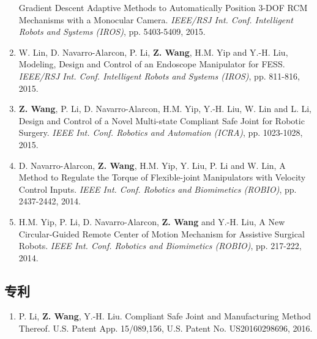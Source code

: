 \documentclass[10pt,letterpaper]{article}
\begin{document}
\begin{enumerate}
    Gradient Descent Adaptive Methods to Automatically Position 3-DOF RCM Mechanisms with a Monocular Camera.
    \textit{{IEEE/RSJ} Int. Conf. Intelligent Robots and Systems (IROS)}, pp. 5403-5409, 2015.
    \item W. Lin, D. Navarro-Alarcon, P. Li, \textbf{Z. Wang}, H.M. Yip and Y.-H. Liu,
    Modeling, Design and Control of an Endoscope Manipulator for FESS.
    \textit{{IEEE/RSJ} Int. Conf. Intelligent Robots and Systems (IROS)}, pp. 811-816, 2015.
    \item \textbf{Z. Wang}, P. Li, D. Navarro-Alarcon, H.M. Yip, Y.-H. Liu, W. Lin and L. Li,
    Design and Control of a Novel Multi-state Compliant Safe Joint for Robotic Surgery.
    \textit{{IEEE} Int. Conf. Robotics and Automation (ICRA)}, pp. 1023-1028, 2015.
    \item D. Navarro-Alarcon, \textbf{Z. Wang}, H.M. Yip, Y. Liu, P. Li and W. Lin,
    A Method to Regulate the Torque of Flexible-joint Manipulators with Velocity Control Inputs.
    \textit{{IEEE} Int. Conf. Robotics and Biomimetics (ROBIO)}, pp. 2437-2442, 2014.
    \item H.M. Yip, P. Li, D. Navarro-Alarcon, \textbf{Z. Wang} and Y.-H. Liu,
    A New Circular-Guided Remote Center of Motion Mechanism for Assistive Surgical Robots.
    \textit{{IEEE} Int. Conf. Robotics and Biomimetics (ROBIO)}, pp. 217-222, 2014.
\end{enumerate}

\subsection*{专利}
\begin{enumerate}
    \item P. Li, \textbf{Z. Wang}, Y.-H. Liu.
    Compliant Safe Joint and Manufacturing Method Thereof.
    U.S. Patent App. 15/089,156, U.S. Patent No. US20160298696, 2016.
\end{enumerate}

\end{document}
